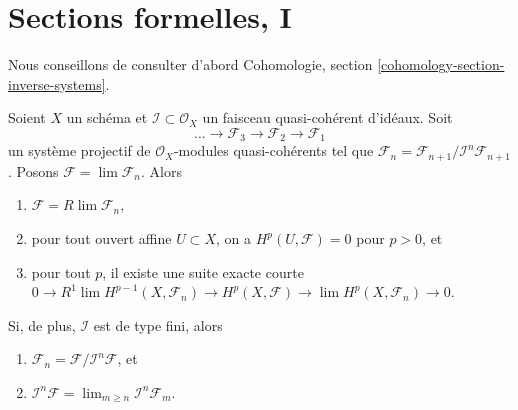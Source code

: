 \section{Sections formelles, I}
\label{section-ML-degree-zero}

\noindent
Nous conseillons de consulter d'abord
Cohomologie, section \ref{cohomology-section-inverse-systems}.

\begin{lemma}
\label{lemma-properties-system}
Soient $X$ un schéma et $\mathcal{I} \subset \mathcal{O}_X$
un faisceau quasi-cohérent d'idéaux. Soit
$$
\ldots \to \mathcal{F}_3 \to \mathcal{F}_2 \to \mathcal{F}_1
$$
un système projectif de $\mathcal{O}_X$-modules quasi-cohérents
tel que
$\mathcal{F}_n = \mathcal{F}_{n + 1}/\mathcal{I}^n\mathcal{F}_{n + 1}$.
Posons $\mathcal{F} = \lim \mathcal{F}_n$. Alors
\begin{enumerate}
\item $\mathcal{F} = R\lim \mathcal{F}_n$,
\item pour tout ouvert affine $U \subset X$, on a
$H^p(U, \mathcal{F}) = 0$ pour $p > 0$, et
\item pour tout $p$, il existe une suite exacte courte
$0 \to R^1\lim H^{p - 1}(X, \mathcal{F}_n) \to
H^p(X, \mathcal{F}) \to \lim H^p(X, \mathcal{F}_n) \to 0$.
\end{enumerate}
Si, de plus, $\mathcal{I}$ est de type fini, alors
\begin{enumerate}
\item[(4)]
$\mathcal{F}_n = \mathcal{F}/\mathcal{I}^n\mathcal{F}$, et
\item[(5)]
$\mathcal{I}^n \mathcal{F} = \lim_{m \geq n} \mathcal{I}^n\mathcal{F}_m$.
\end{enumerate}
\end{lemma}


